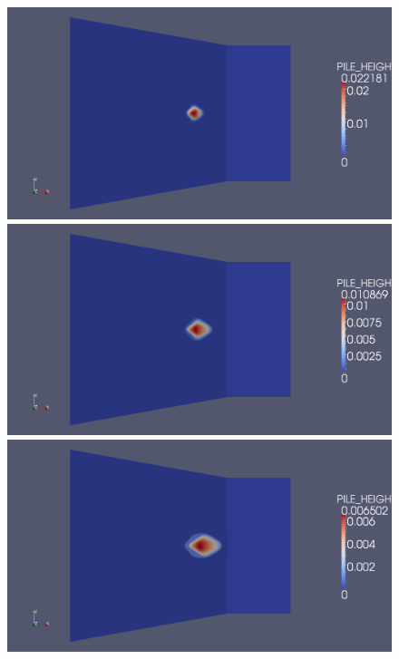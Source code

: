 \documentclass[letterpaper,10pt]{article}
\begin{document}
\begin{figure}[H]
  \begin{minipage}[b]{.5\linewidth}
    \centering
    \includegraphics[width=1\textwidth]{IMAGES/ordinary/1.png}
    \includegraphics[width=1\textwidth]{IMAGES/ordinary/2.png}
    \includegraphics[width=1\textwidth]{IMAGES/ordinary/3.png}
  \end{minipage}

\end{figure}
\end{document}
